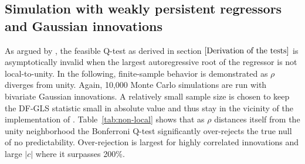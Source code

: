 \documentclass{article}
\begin{document}
\subsection{Simulation with weakly persistent regressors and Gaussian innovations}
\label{Simulation with weakly persistent regressors and Gaussian innovations}
As argued by \citet{phillips2014confidence}, the feasible Q-test as derived in section $\ref{Derivation of the tests}$ is asymptotically invalid when the largest autoregressive root of the regressor is not local-to-unity. In the following, finite-sample behavior is demonstrated as $\rho$ diverges from unity. Again, 10,000 Monte Carlo simulations are run with bivariate Gaussian innovations. A relatively small sample size is chosen to keep the DF-GLS statistic small in absolute value and thus stay in the vicinity of the implementation of \citet{campbell2005implementing}. Table~\vref{tab:non-local} shows that as $\rho$ distances itself from the unity neighborhood the Bonferroni Q-test significantly over-rejects the true null of no predictability. Over-rejection is largest for highly correlated innovations and large $|c|$ where it surpasses 200\%.
\end{document}
